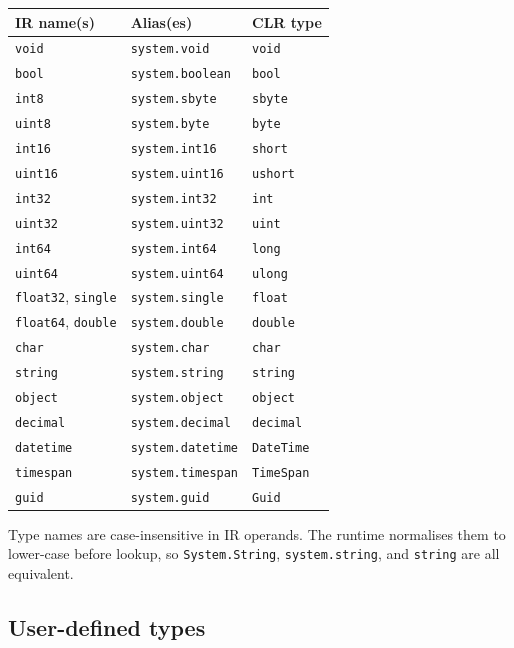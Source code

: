 \documentclass[11pt,a4paper]{article}
\begin{document}
\begin{longtable}{lll}
\toprule
\textbf{IR name(s)} & \textbf{Alias(es)} & \textbf{CLR type} \\
\midrule
\texttt{void}   & \texttt{system.void}    & \texttt{void} \\
\texttt{bool}   & \texttt{system.boolean} & \texttt{bool} \\
\texttt{int8}   & \texttt{system.sbyte}   & \texttt{sbyte} \\
\texttt{uint8}  & \texttt{system.byte}    & \texttt{byte} \\
\texttt{int16}  & \texttt{system.int16}   & \texttt{short} \\
\texttt{uint16} & \texttt{system.uint16}  & \texttt{ushort} \\
\texttt{int32}  & \texttt{system.int32}   & \texttt{int} \\
\texttt{uint32} & \texttt{system.uint32}  & \texttt{uint} \\
\texttt{int64}  & \texttt{system.int64}   & \texttt{long} \\
\texttt{uint64} & \texttt{system.uint64}  & \texttt{ulong} \\
\texttt{float32}, \texttt{single} & \texttt{system.single} & \texttt{float} \\
\texttt{float64}, \texttt{double} & \texttt{system.double} & \texttt{double} \\
\texttt{char}   & \texttt{system.char}    & \texttt{char} \\
\texttt{string} & \texttt{system.string}  & \texttt{string} \\
\texttt{object} & \texttt{system.object}  & \texttt{object} \\
\texttt{decimal}  & \texttt{system.decimal}  & \texttt{decimal} \\
\texttt{datetime} & \texttt{system.datetime} & \texttt{DateTime} \\
\texttt{timespan} & \texttt{system.timespan} & \texttt{TimeSpan} \\
\texttt{guid}     & \texttt{system.guid}     & \texttt{Guid} \\
\bottomrule
\end{longtable}

Type names are case-insensitive in IR operands.  The runtime normalises them
to lower-case before lookup, so \texttt{System.String}, \texttt{system.string},
and \texttt{string} are all equivalent.

\subsection{User-defined types}
\end{document}
